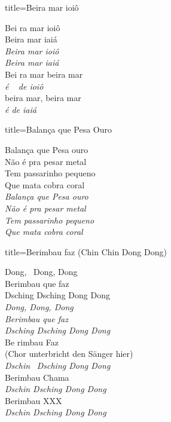 \documentclass[fontsize=14pt, paper=a4, twoside, DIV=20]{scrreprt} %
\begin{document}
\begin{multicols*}{2}
\begin{song}{title={Beira mar ioiô}}
    \begin{verse*}
        Bei ra mar ioiô\\
        Beira mar iaiá\\
        \textit{Beira mar ioiô}\\
        \textit{Beira mar iaiá}\\

        Bei ra mar beira mar\\
        \textit{é} \ \textit{ de ioiô}\\
        beira mar, beira mar\\
        \textit{é de iaiá}\\
    \end{verse*}
\end{song}

\begin{song}{title={Balança que Pesa Ouro}}
        \begin{verse*}
        Balança que Pesa ouro \\
        Não é pra pesar metal \\
        Tem passarinho pequeno \\
        Que mata cobra coral \\

        \textit{Balança que Pesa ouro \\
        Não é pra pesar metal \\
        Tem passarinho pequeno \\
        Que mata cobra coral} \\
        \end{verse*}
\end{song}

\columnbreak
\begin{song}{title={Berimbau faz (Chin Chin Dong Dong)}}
        \begin{verse*}
            Dong, \ Dong, Dong\\
            Berimbau que faz\\
            Dsching Dsching Dong Dong\\
            \textit{Dong, Dong, Dong\\
            Berimbau que faz\\
            Dsching Dsching Dong Dong}\\
            Be rimbau Faz \\
            (Chor unterbricht den Sänger hier)\\
            \textit{Dschin} \ \textit{Dsching Dong Dong}\\
            Berimbau Chama\\
            \textit{Dschin Dsching Dong Dong}\\
            Berimbau XXX\\
            \textit{Dschin Dsching Dong Dong}\\
        \end{verse*}
\end{song}


\end{multicols*}
\end{document}
